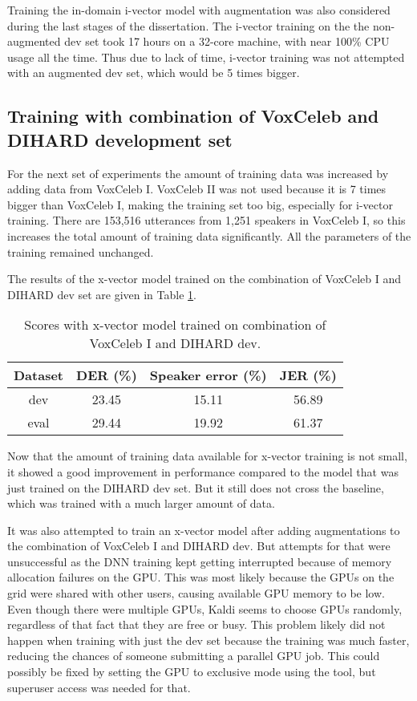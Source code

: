 		Training the in-domain i-vector model with augmentation was also considered during the last stages of the dissertation. The i-vector training on the the non-augmented dev set took 17 hours on a 32-core machine, with near 100\% CPU usage all the time. Thus due to lack of time, i-vector training was not attempted with an augmented dev set, which would be 5 times bigger.
		
		\subsection{Training with combination of VoxCeleb and DIHARD development set}
			For the next set of experiments the amount of training data was increased by adding data from VoxCeleb I. VoxCeleb II was not used because it is 7 times bigger than VoxCeleb I, making the training set too big, especially for i-vector training. There are 153,516 utterances from 1,251 speakers in VoxCeleb I, so this increases the total amount of training data significantly. All the parameters of the training remained unchanged.
			
			The results of the x-vector model trained on the combination of VoxCeleb I and DIHARD dev set are given in Table \ref{table-voxdev-xvec}.
			
			\begin{table}[h]
				\centering
				\begin{tabular}{|c|c|c|c|}
					\hline
					Dataset & DER (\%) & Speaker error (\%) & JER (\%) \\
					\hline
					dev & 23.45 & 15.11 & 56.89 \\
					\hline
					eval & 29.44 & 19.92 & 61.37 \\
					\hline
				\end{tabular}
				\caption{Scores with x-vector model trained on combination of VoxCeleb I and DIHARD dev.}
				\label{table-voxdev-xvec}
			\end{table}
		
		Now that the amount of training data available for x-vector training is not small, it showed a good improvement in performance compared to the model that was just trained on the DIHARD dev set. But it still does not cross the baseline, which was trained with a much larger amount of data.
		
		It was also attempted to train an x-vector model after adding augmentations to the combination of VoxCeleb I and DIHARD dev. But attempts for that were unsuccessful as the DNN training kept getting interrupted because of memory allocation failures on the GPU. This was most likely because the GPUs on the grid were shared with other users, causing available GPU memory to be low. Even though there were multiple GPUs, Kaldi seems to choose GPUs randomly, regardless of that fact that they are free or busy. This problem likely did not happen when training with just the dev set because the training was much faster, reducing the chances of someone submitting a parallel GPU job. This could possibly be fixed by setting the GPU to exclusive mode using the  tool, but superuser access was needed for that.
				
